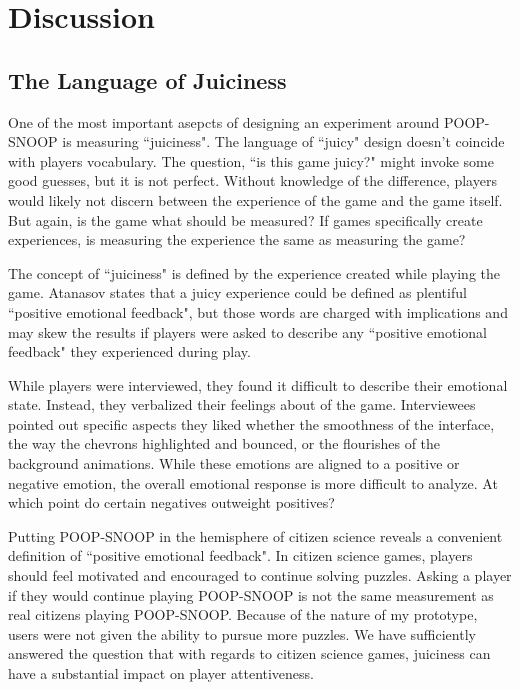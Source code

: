 \chapter{Discussion}

\section{The Language of Juiciness}

One of the most important asepcts of designing an experiment around POOP-SNOOP is measuring ``juiciness". The language of ``juicy" design doesn't coincide with players vocabulary. The question, ``is this game juicy?" might invoke some good guesses, but it is not perfect. Without knowledge of the difference, players would likely not discern between the experience of the game and the game itself. But again, is the game what should be measured? If games specifically create experiences, is measuring the experience the same as measuring the game? 

The concept of ``juiciness" is defined by the experience created while playing the game. Atanasov \cite{atanasov} states that a juicy experience could be defined as plentiful ``positive emotional feedback", but those words are charged with implications and may skew the results if players were asked to describe any ``positive emotional feedback" they experienced during play.

While players were interviewed, they found it difficult to describe their emotional state. Instead, they verbalized their feelings about of the game. Interviewees pointed out specific aspects they liked whether the smoothness of the interface, the way the chevrons highlighted and bounced, or the flourishes of the background animations. While these emotions are aligned to a positive or negative emotion, the overall emotional response is more difficult to analyze. At which point do certain negatives outweight positives?

Putting POOP-SNOOP in the hemisphere of citizen science reveals a convenient definition of ``positive emotional feedback". In citizen science games, players should feel motivated and encouraged to continue solving puzzles. Asking a player if they would continue playing POOP-SNOOP is not the same measurement as real citizens playing POOP-SNOOP. Because of the nature of my prototype, users were not given the ability to pursue more puzzles. We have sufficiently answered the question that with regards to citizen science games, juiciness can have a substantial impact on player attentiveness.

